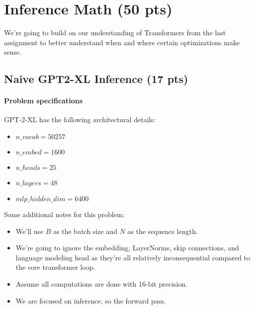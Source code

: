 \section{Inference Math (50 pts)} 
We're going to build on our understanding of Transformers from the last assignment to better understand when and where certain optimizations make sense. 



\subsection{Naive GPT2-XL Inference (17 pts)}

\paragraph{Problem specifications} GPT-2-XL has the following architectural details:
\begin{itemize}
    \item $n\_vocab = 50257$
    \item $n\_embed = 1600$
    \item $n\_heads = 25$
    \item $n\_layers = 48$
    \item $mlp\_hidden\_dim = 6400$
\end{itemize}

Some additional notes for this problem:
\begin{itemize}
    \item We'll use $B$ as the batch size and $N$ as the sequence length.
    \item We're going to ignore the embedding, LayerNorms, skip connections, and language modeling head as they're all relatively inconsequential compared to the core transformer loop.
    \item Assume all computations are done with 16-bit precision.
    \item We are focused on inference, so the forward pass.
\end{itemize}



